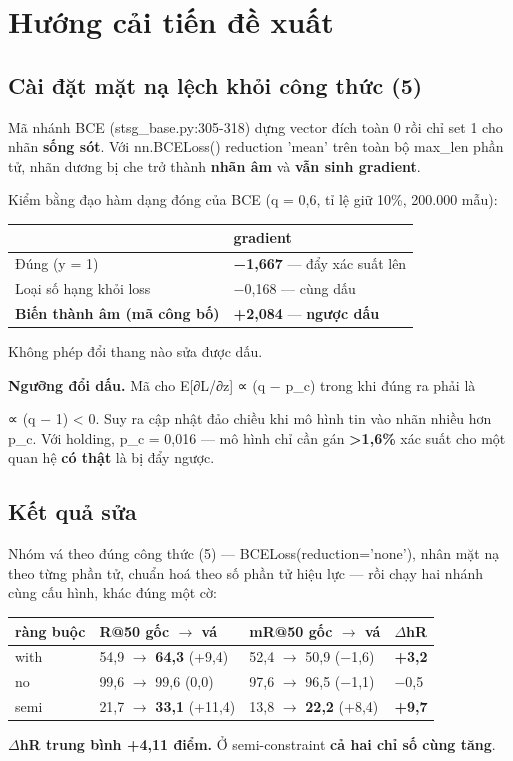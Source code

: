 \documentclass[11pt,a4paper]{article}
\newcommand{\code}[1]{{\ttfamily\small\color{codetext}#1}}
\begin{document}
\section{Hướng cải tiến đề xuất}
\subsection{Cài đặt mặt nạ lệch khỏi công thức (5)}
Mã nhánh BCE (\code{stsg\_base.py:305-318}) dựng vector đích toàn 0 rồi chỉ set 1 cho nhãn \textbf{sống sót}. Với \code{nn.BCELoss()} reduction \code{'mean'} trên toàn bộ \code{max\_len} phần tử, nhãn dương bị che trở thành \textbf{nhãn âm} và \textbf{vẫn sinh gradient}.

Kiểm bằng đạo hàm dạng đóng của BCE (q = 0,6, tỉ lệ giữ 10\%, 200.000 mẫu):

\begin{center}\small
\begin{tabular}{@{}ll@{}}
\toprule
\textbf{} & \textbf{gradient}\\
\midrule
Đúng (y = 1) & \textbf{−1,667} --- đẩy xác suất lên\\
Loại số hạng khỏi loss & −0,168 --- cùng dấu\\
\textbf{Biến thành âm (mã công bố)} & \textbf{+2,084} --- \textbf{ngược dấu}\\
\bottomrule
\end{tabular}
\end{center}
Không phép đổi thang nào sửa được dấu.

\textbf{Ngưỡng đổi dấu.} Mã cho \code{E[∂L/∂z] ∝ (q − p\_c)} trong khi đúng ra phải là

\code{∝ (q − 1) < 0}. Suy ra cập nhật đảo chiều khi mô hình tin vào nhãn nhiều hơn \code{p\_c}. Với \code{holding}, \code{p\_c = 0,016} --- mô hình chỉ cần gán \textbf{>1,6\%} xác suất cho một quan hệ \textbf{có thật} là bị đẩy ngược.

\subsection{Kết quả sửa}
Nhóm vá theo đúng công thức (5) --- \code{BCELoss(reduction='none')}, nhân mặt nạ theo từng phần tử, chuẩn hoá theo số phần tử hiệu lực --- rồi chạy hai nhánh cùng cấu hình, khác đúng một cờ:

\begin{center}\small
\begin{tabular}{@{}llll@{}}
\toprule
\textbf{ràng buộc} & \textbf{R@50 gốc $\rightarrow$ vá} & \textbf{mR@50 gốc $\rightarrow$ vá} & \textbf{$\Delta$hR}\\
\midrule
with & 54,9 $\rightarrow$ \textbf{64,3} (+9,4) & 52,4 $\rightarrow$ 50,9 (−1,6) & \textbf{+3,2}\\
no & 99,6 $\rightarrow$ 99,6 (0,0) & 97,6 $\rightarrow$ 96,5 (−1,1) & −0,5\\
semi & 21,7 $\rightarrow$ \textbf{33,1} (+11,4) & 13,8 $\rightarrow$ \textbf{22,2} (+8,4) & \textbf{+9,7}\\
\bottomrule
\end{tabular}
\end{center}
\textbf{$\Delta$hR trung bình +4,11 điểm.} Ở semi-constraint \textbf{cả hai chỉ số cùng tăng}.
\end{document}
